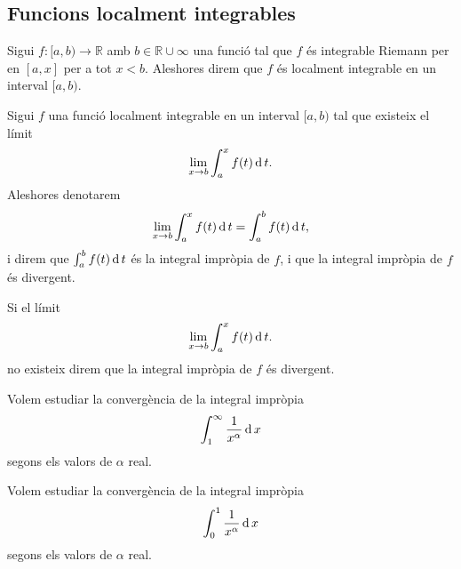\documentclass[../../Main.tex]{subfiles}
\begin{document}
	\subsection{Funcions localment integrables}
	\begin{definition}
		\label{def:funció localment integrable}
		Sigui \(f\colon[a,b)\longrightarrow\mathbb{R}\) amb \(b\in\mathbb{R}\cup\infty\) una funció tal que \(f\) és integrable Riemann per en \([a,x]\) per a tot \(x<b\). Aleshores direm que \(f\) és localment integrable en un interval \([a,b)\).
	\end{definition}
	\begin{definition}
		\label{def:integral impròpia}
		\label{def:integral impròpia convergent}
		\label{def:integral impròpia divergent}
		Sigui \(f\) una funció localment integrable en un interval \([a,b)\) tal que existeix el límit
		\[\lim_{x\to b}\int_{a}^{x}f(t)\operatorname{d} t.\]
		Aleshores denotarem
		\[\lim_{x\to b}\int_{a}^{x}f(t)\operatorname{d} t=\int_{a}^{b}f(t)\operatorname{d} t,\]
		i direm que \(\int_{a}^{b}f(t)\operatorname{d} t\) és la integral impròpia de \(f\), i que la integral impròpia de \(f\) és divergent.
		
		Si el límit
		\[\lim_{x\to b}\int_{a}^{x}f(t)\operatorname{d} t.\]
		no existeix direm que la integral impròpia de \(f\) és divergent.
	\end{definition}
	\begin{example}
		\label{ex:funció de la sèrie harmònica en integrals impròpies entre 1 i infinit}
		Volem estudiar la convergència de la integral impròpia
		\[\int_{1}^{\infty}\frac{1}{x^{\alpha}}\operatorname{d} x\]
		segons els valors de \(\alpha\) real.
		\begin{solution}
		\end{solution}
	\end{example}
	\begin{example}
		\label{ex:funció de la sèrie harmònica en integrals impròpies entre 0 i 1}
		Volem estudiar la convergència de la integral impròpia
		\[\int_{0}^{1}\frac{1}{x^{\alpha}}\operatorname{d} x\]
		segons els valors de \(\alpha\) real.
		\begin{solution}
		\end{solution}
	\end{example}
\end{document}
